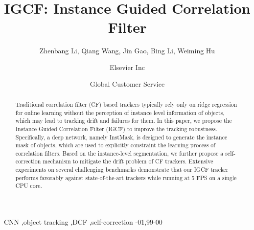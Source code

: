 \documentclass[review]{elsarticle}
\begin{document}
\begin{frontmatter}

\title{IGCF: Instance Guided Correlation Filter}

\author{Zhenbang Li, Qiang Wang, Jin Gao, Bing Li, Weiming Hu}
\address{Radarweg 29, Amsterdam}

\author[mymainaddress,mysecondaryaddress]{Elsevier Inc}

\author[mysecondaryaddress]{Global Customer Service}

\address[mymainaddress]{1600 John F Kennedy Boulevard, Philadelphia}
\address[mysecondaryaddress]{360 Park Avenue South, New York}

\begin{abstract}
Traditional correlation filter (CF) based trackers typically rely only on ridge regression for online learning without the perception of instance level information of objects, which may lead to tracking drift and failures for them. In this paper, we propose the Instance Guided Correlation Filter (IGCF) to improve the tracking robustness. Specifically, a deep network, namely InstMask, is designed to generate the instance mask of objects, which are used to explicitly constraint the learning process of correlation filters. Based on the instance-level segmentation, we further propose a self-correction mechanism to mitigate the drift problem of CF trackers. Extensive experiments on several challenging benchmarks demonstrate that our IGCF tracker performs favorably against state-of-the-art trackers while running at 5 FPS on a single CPU core.
\end{abstract}

\begin{keyword}
CNN \sep object tracking \sep DCF \sep self-correction
-01\sep  99-00
\end{keyword}

\end{frontmatter}

\linenumbers
\end{document}
